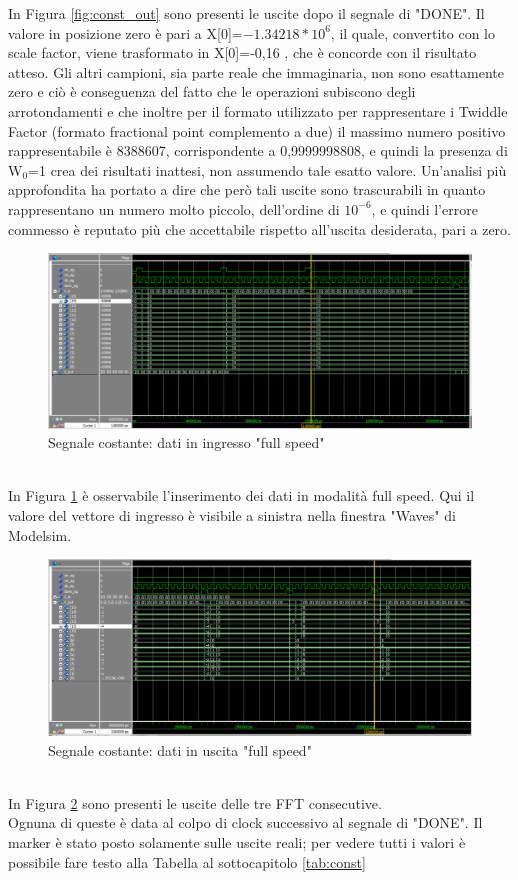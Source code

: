 \documentclass[a4paper, titlepage]{article}
\begin{document}
In Figura \ref{fig:const_out} sono presenti le uscite dopo il segnale di "DONE". Il valore in posizione zero è pari a X[0]=$-1.34218*10^6$, il quale, convertito con lo scale factor, viene trasformato in X[0]=-0,16 , che è concorde con il risultato atteso. Gli altri campioni, sia parte reale che immaginaria, non sono esattamente zero e ciò è conseguenza del fatto che le operazioni subiscono degli arrotondamenti e che inoltre per il formato utilizzato per rappresentare i Twiddle Factor (formato fractional point complemento a due) il massimo numero positivo rappresentabile è 8388607, corrispondente a 0,9999998808, e quindi la presenza di W$_0$=1 crea dei risultati inattesi, non assumendo tale esatto valore. Un'analisi più approfondita ha portato a dire che però tali uscite sono trascurabili in quanto rappresentano un numero molto piccolo, dell'ordine di $10^{-6}$, e quindi l'errore commesso è reputato più che accettabile rispetto all'uscita desiderata, pari a zero.
\begin{figure}[h]
    \centering
    \includegraphics[scale=0.45]{test_const(-1)/fs_cost(-1)_in_double.png}
    \caption{Segnale costante: dati in ingresso "full speed"}
    \label{fig:const_in_doble}
\end{figure}\\
In Figura \ref{fig:const_in_doble} è osservabile l'inserimento dei dati in modalità full speed. Qui il valore del vettore di ingresso è visibile a sinistra nella finestra "Waves" di Modelsim.
\pagebreak
\begin{figure}[h]
    \centering
    \includegraphics[scale=0.45]{test_const(-1)/fs_cost(-1)_out_double.png}
    \caption{Segnale costante: dati in uscita "full speed"}
    \label{fig:const_out_doble}
\end{figure}\\
In Figura \ref{fig:const_out_doble} sono presenti le uscite delle tre FFT consecutive.\\Ognuna di queste è data al colpo di clock successivo al segnale di "DONE". Il marker è stato posto solamente sulle uscite reali; per vedere tutti i valori è possibile fare testo alla Tabella al sottocapitolo \ref{tab:const}
\end{document}
